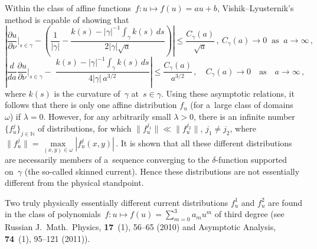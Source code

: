 \documentclass[10pt,a4paper]{article}
\begin{document}
Within the class of affine functions~$f: u\mapsto f(u)=au+b$,
Vishik--\allowbreak Lyusternik's method is capable of showing that
\begin{equation*}\label{uasymp}
\left|\frac{{\partial } u}{{\partial
}\nu}\biggl|_{s\in\gamma}-\left(\frac1{|\gamma|}-
\frac{k(s)-|\gamma|^{-1}\int_\gamma k(s)\,ds}{2|\gamma|\sqrt{a}}\right)\right|\le
\frac{C_{\gamma}(a)}{\sqrt{a}}\,,
\ C_{\gamma}(a)\to 0\;\; \text{as}\;\;
a\to\infty\,,
\end{equation*}
\begin{equation*}\label{Vasump}
\left|\frac{d}{d a}\frac{{\partial } u}{{\partial
}\nu}\biggl|_{s\in\gamma}-\; \frac{k(s)-|\gamma|^{-1}\int_\gamma
k(s)\,ds}{4|\gamma|\,{a}^{3/2}}\right|\le
\frac{C_{\gamma}(a)}{a^{3/2}}\,,\quad C_{\gamma}(a)\to 0\quad
\text{as}\quad
a\to\infty\,,
\end{equation*}
where $k(s)$ is the curvature of~$\gamma$ at~$s\in\gamma$. Using
these asymptotic relations, it follows that there is only one
affine distribution $f_u$ (for a~large class of domains~$\omega$)
if $\lambda\overset{}{=}0$. However, for any arbitrarily small
$\lambda>0$, there is an infinite number
$\{f^j_u\}_{j\in\mathbb{N}}$ of distributions, for which
$\|f^{j_1}_u\|\ll\|f^{j_2}_u\|$, $j_1\ne j_2$, where $\|f^j_u\|=
\max\limits_{(x,y)\in\omega}\left|f^j_u(x,y)\right|\,.$
It is shown that all these different distributions are necessarily
members of a~sequence converging to the $\delta$-function
supported on~$\gamma$ (the so-called skinned current). Hence these
distributions are not essentially different from the physical
standpoint.

Two truly physically essentially different current distributions
$f^1_{u}$ and $f^2_{u}$ are found in the class of polynomials~$f:
u\mapsto f(u)=\sum_{m=0}^3a_mu^m$ of third degree (see
Russian J.~Math.\ Physics, {\bf 17}~(1), 56--65 (2010) and
Asymptotic Analysis, {\bf 74}~(1), 95--121  (2011)).
\end{document}
